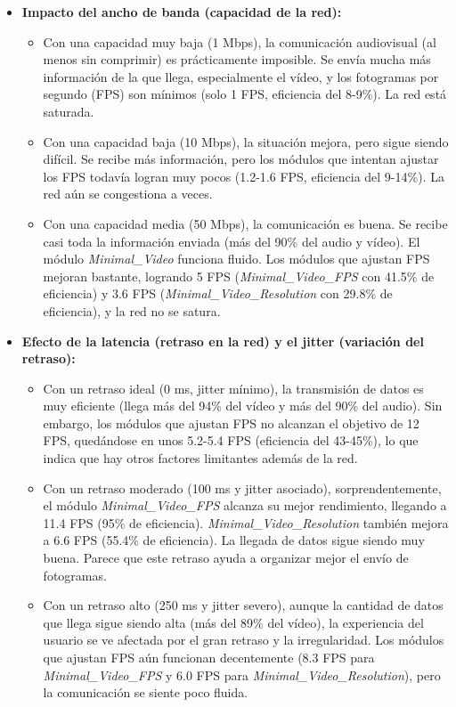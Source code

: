 \begin{itemize}
\item \textbf{Impacto del ancho de banda (capacidad de la red):}
\begin{itemize}
\item Con una capacidad muy baja (1 Mbps), la comunicación audiovisual (al menos sin comprimir) es prácticamente imposible. Se envía mucha más información de la que llega, especialmente el vídeo, y los fotogramas por segundo (FPS) son mínimos (solo 1 FPS, eficiencia del 8-9\%). La red está saturada.
\item Con una capacidad baja (10 Mbps), la situación mejora, pero sigue siendo difícil. Se recibe más información, pero los módulos que intentan ajustar los FPS todavía logran muy pocos (1.2-1.6 FPS, eficiencia del 9-14\%). La red aún se congestiona a veces.
\item Con una capacidad media (50 Mbps), la comunicación es buena. Se recibe casi toda la información enviada (más del 90\% del audio y vídeo). El módulo \textit{Minimal\_Video} funciona fluido. Los módulos que ajustan FPS mejoran bastante, logrando 5 FPS (\textit{Minimal\_Video\_FPS} con 41.5\% de eficiencia) y 3.6 FPS (\textit{Minimal\_Video\_Resolution} con 29.8\% de eficiencia), y la red no se satura.
\end{itemize}
\item \textbf{Efecto de la latencia (retraso en la red) y el jitter (variación del retraso):}
\begin{itemize}
    \item Con un retraso ideal (0 ms, jitter mínimo), la transmisión de datos es muy eficiente (llega más del 94\% del vídeo y más del 90\% del audio). Sin embargo, los módulos que ajustan FPS no alcanzan el objetivo de 12 FPS, quedándose en unos 5.2-5.4 FPS (eficiencia del 43-45\%), lo que indica que hay otros factores limitantes además de la red.
    \item Con un retraso moderado (100 ms y jitter asociado), sorprendentemente, el módulo \textit{Minimal\_Video\_FPS} alcanza su mejor rendimiento, llegando a 11.4 FPS (95\% de eficiencia). \textit{Minimal\_Video\_Resolution} también mejora a 6.6 FPS (55.4\% de eficiencia). La llegada de datos sigue siendo muy buena. Parece que este retraso ayuda a organizar mejor el envío de fotogramas.
    \item Con un retraso alto (250 ms y jitter severo), aunque la cantidad de datos que llega sigue siendo alta (más del 89\% del vídeo), la experiencia del usuario se ve afectada por el gran retraso y la irregularidad. Los módulos que ajustan FPS aún funcionan decentemente (8.3 FPS para \textit{Minimal\_Video\_FPS} y 6.0 FPS para \textit{Minimal\_Video\_Resolution}), pero la comunicación se siente poco fluida.
\end{itemize}


\end{itemize}
